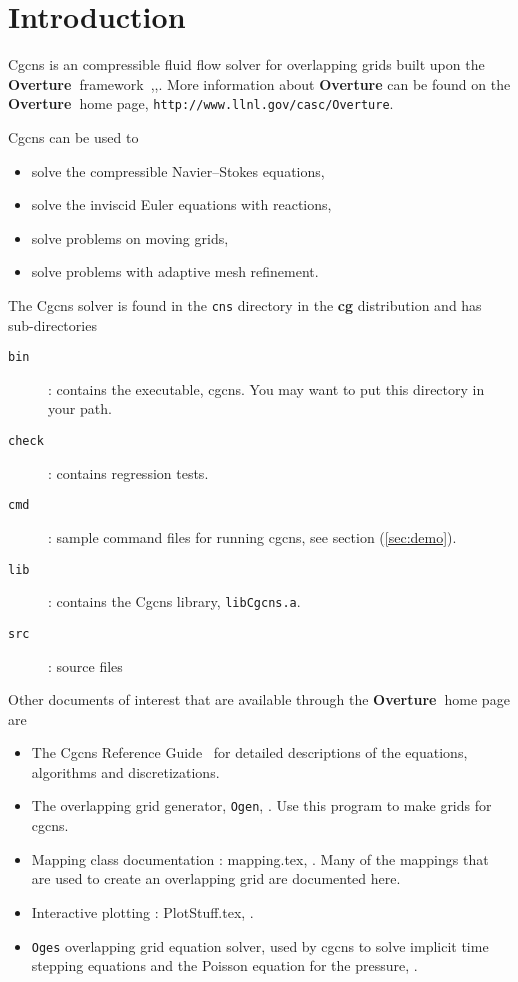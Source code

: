 \documentclass{article}
\newcommand{\Overture}{{\bf Overture\ }}
\begin{document}
\section{Introduction}

Cgcns is an compressible fluid flow solver for overlapping grids built upon
the \Overture framework~\cite{Brown97},\cite{Henshaw96a},\cite{iscope97}.
More information about
{\bf Overture} can be found on the \Overture home page, {\tt http://www.llnl.gov/\-casc/\-Overture}.


Cgcns can be used to 
\begin{itemize}
  \item solve the compressible Navier--Stokes equations,
  \item solve the inviscid Euler equations with reactions, 
  \item solve problems on moving grids, 
  \item solve problems with adaptive mesh refinement.
\end{itemize} 

The Cgcns solver is found in the {\tt cns} directory in the {\bf cg} distribution and has
sub-directories
\begin{description}
 \item[{\tt bin}] : contains the executable, cgcns. You may want to put this directory in your path.
 \item[{\tt check}] : contains regression tests.
 \item[{\tt cmd}] : sample command files for running cgcns, see section (\ref{sec:demo}).
 \item[{\tt lib}] : contains the Cgcns library, {\tt libCgcns.a}.
 \item[{\tt src}] : source files 
\end{description}


\noindent
Other documents of interest that are available through the \Overture home page are
\begin{itemize}
\item The Cgcns Reference Guide~\cite{CgcnsReferenceManual} for detailed descriptions of the
      equations, algorithms and discretizations.
\item The overlapping grid generator, {\tt Ogen}, \cite{OGEN}. Use this program to make grids for cgcns.
\item Mapping class documentation : {\ff mapping.tex}, \cite{MAPPINGS}. Many of the mappings that
   are used to create an overlapping grid are documented here. 
\item Interactive plotting : {\ff PlotStuff.tex}, \cite{PLOTSTUFF}.
\item {\tt Oges} overlapping grid equation solver, used by cgcns to solve implicit time stepping
    equations and the Poisson equation for the pressure, \cite{OGES}.
\end{itemize}
\end{document}
